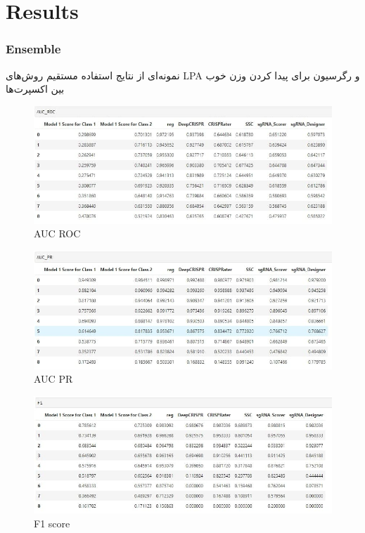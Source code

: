 \documentclass[12pt,a4paper,BCOR=.7cm,headsepline,bibliography=totoc]{report}
\begin{document}
\chapter{Results}
\subsection{Ensemble}
نمونه‌ای از نتایج استفاده مستقیم روش‌های LPA و رگرسیون برای پیدا کردن وزن خوب بین اکسپرت‌ها
\begin{figure}[H]
\centering
\includegraphics[width=15cm, ]{pictures/DeepCRISPR_AUR.jpg}
\caption{
AUC ROC
}\label{wrap-fig:4}
\end{figure}

\begin{figure}[H]
\centering
\includegraphics[width=15cm, ]{pictures/DeepCRISPR_PR.jpg}
\caption{
AUC PR
}\label{wrap-fig:4}
\end{figure}

\begin{figure}[H]
\centering
\includegraphics[width=15cm, ]{pictures/DeepCRISPR_F1.jpg}
\caption{
F1 score
}\label{wrap-fig:4}
\end{figure}
\end{document}
